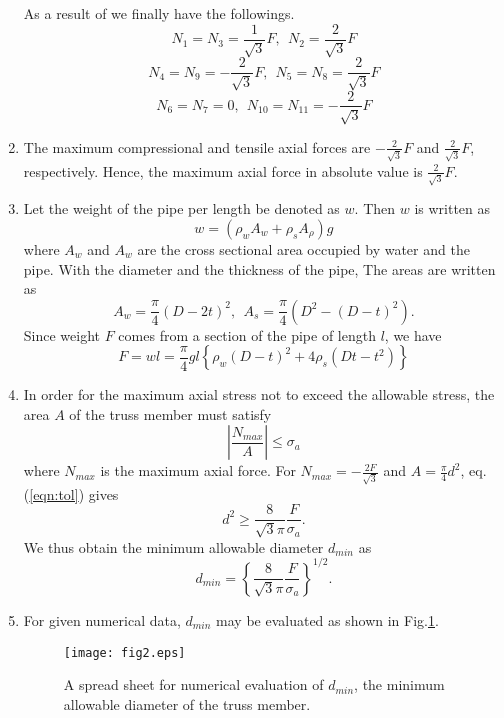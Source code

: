 \documentclass[10pt,a4j]{article}
\begin{document}
\begin{enumerate}
	As a result of we finally have the followings. 
	\[
		N_1=N_3=\frac{1}{\sqrt{3}}F ,\ \ N_2=\frac{2}{\sqrt{3}}F
	\]
	\[
		N_4=N_9=-\frac{2}{\sqrt{3}}F ,\ \ N_5=N_8=\frac{2}{\sqrt{3}}F
	\]
	\[
		N_6=N_7=0, \ \ N_{10}=N_{11}=-\frac{2}{\sqrt{3}}F
	\]
\item
	The maximum compressional and tensile axial forces are $-\frac{2}{\sqrt{3}}F$ 
	and $\frac{2}{\sqrt{3}}F$, respectively.
	Hence, the maximum axial force in absolute value is $\frac{2}{\sqrt{3}}F$.
\item
	Let the weight of the pipe per length be denoted as $w$. Then $w$ is written as 
	\begin{equation}
		w= \left( \rho_w A_w + \rho_s A_\rho \right)g
		\label{eqn:}
	\end{equation}
	where $A_w$ and $A_w$ are the cross sectional area occupied by 
	water and the pipe.
	With the diameter and the thickness of the pipe, The areas are written as 
	\begin{equation}
		A_w=\frac{\pi}{4}(D-2t)^2, \ \ A_s=\frac{\pi}{4}\left(D^2-(D-t)^2\right).
		\label{eqn:}
	\end{equation}
	Since weight $F$ comes from a section of the pipe of length $l$, we have
	\begin{equation}
		F=wl=
		\frac{\pi}{4}gl
		\left\{ 
			\rho_w(D-t)^2+ 4\rho_s\left(Dt-t^2\right)
		\right\}
		\label{eqn:F_explicit}
	\end{equation}
\item
	In order for the maximum axial stress not to exceed the allowable stress, the area 
	$A$ of the truss member must satisfy 
	\begin{equation}
		\left| \frac{N_{max}}{A}\right| \leq \sigma_a
		\label{eqn:tol}
	\end{equation}
	where $N_{max}$ is the maximum axial force.
	For $N_{max}=-\frac{2F}{\sqrt{3}}$ and $A=\frac{\pi}{4}d^2$, eq.(\ref{eqn:tol}) gives
	\begin{equation}
		d^2 \geq  \frac{8}{\sqrt{3}\pi} \frac{F}{\sigma_a}.
		\label{eqn:}
	\end{equation}
	We thus obtain the minimum allowable diameter $d_{min}$ as 
	\begin{equation}
		d_{min}=
		\left\{ \frac{8}{\sqrt{3}\pi} \frac{F}{\sigma_a}
		\right\}^{1/2}.
		\label{eqn:dmin}
	\end{equation}
\item
	For given numerical data, $d_{min}$ may be evaluated as shown in Fig.\ref{fig:fig2}.
	\begin{figure}[h]
	\begin{center}
	\texttt{[image: fig2.eps]} 
	\end{center}
	\caption{A spread sheet for numerical evaluation of $d_{min}$, the minimum 
		allowable diameter of the truss member.} 
	\label{fig:fig2}
	\end{figure}
\end{enumerate}
\end{document}

